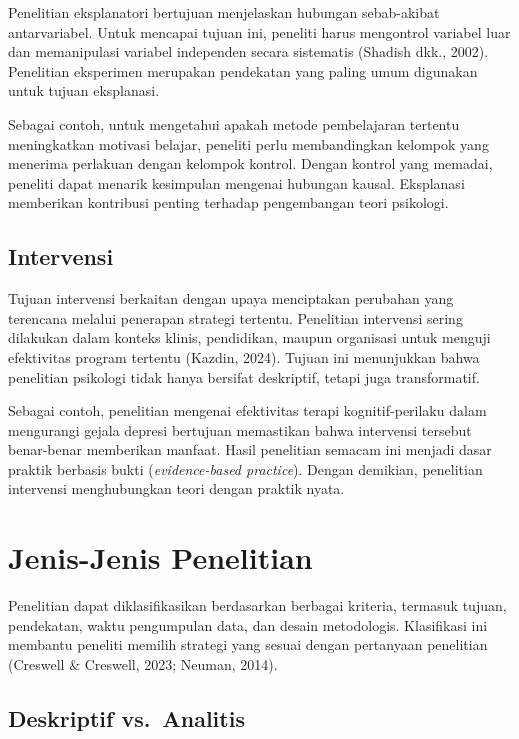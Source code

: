 \documentclass[
  indonesian,
  letterpaper,
  DIV=11,
  numbers=noendperiod]{scrreprt}
\begin{document}
Penelitian eksplanatori bertujuan menjelaskan hubungan sebab-akibat
antarvariabel. Untuk mencapai tujuan ini, peneliti harus mengontrol
variabel luar dan memanipulasi variabel independen secara sistematis
(Shadish dkk., 2002). Penelitian eksperimen merupakan pendekatan yang
paling umum digunakan untuk tujuan eksplanasi.

Sebagai contoh, untuk mengetahui apakah metode pembelajaran tertentu
meningkatkan motivasi belajar, peneliti perlu membandingkan kelompok
yang menerima perlakuan dengan kelompok kontrol. Dengan kontrol yang
memadai, peneliti dapat menarik kesimpulan mengenai hubungan kausal.
Eksplanasi memberikan kontribusi penting terhadap pengembangan teori
psikologi.

\subsection{Intervensi}\label{intervensi}

Tujuan intervensi berkaitan dengan upaya menciptakan perubahan yang
terencana melalui penerapan strategi tertentu. Penelitian intervensi
sering dilakukan dalam konteks klinis, pendidikan, maupun organisasi
untuk menguji efektivitas program tertentu (Kazdin, 2024). Tujuan ini
menunjukkan bahwa penelitian psikologi tidak hanya bersifat deskriptif,
tetapi juga transformatif.

Sebagai contoh, penelitian mengenai efektivitas terapi kognitif-perilaku
dalam mengurangi gejala depresi bertujuan memastikan bahwa intervensi
tersebut benar-benar memberikan manfaat. Hasil penelitian semacam ini
menjadi dasar praktik berbasis bukti (\emph{evidence-based practice}).
Dengan demikian, penelitian intervensi menghubungkan teori dengan
praktik nyata.

\section{Jenis-Jenis Penelitian}\label{jenis-jenis-penelitian}

Penelitian dapat diklasifikasikan berdasarkan berbagai kriteria,
termasuk tujuan, pendekatan, waktu pengumpulan data, dan desain
metodologis. Klasifikasi ini membantu peneliti memilih strategi yang
sesuai dengan pertanyaan penelitian (Creswell \& Creswell, 2023; Neuman,
2014).

\subsection{Deskriptif vs.~Analitis}\label{deskriptif-vs.-analitis}
\end{document}
